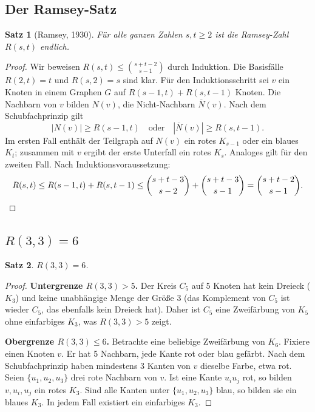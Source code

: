 \documentclass[12pt,a4paper]{amsart}
\newtheorem{theorem}{Satz}[section]
\theoremstyle{definition}
\theoremstyle{remark}
\begin{document}
\subsection{Der Ramsey-Satz}

\begin{theorem}[Ramsey, 1930]\label{satz:ramsey-endlich}
F\"ur alle ganzen Zahlen $s,t \ge 2$ ist die Ramsey-Zahl $R(s,t)$ endlich.
\end{theorem}

\begin{proof}
Wir beweisen $R(s,t) \le \binom{s+t-2}{s-1}$ durch Induktion.  Die Basisfälle
$R(2,t)=t$ und $R(s,2)=s$ sind klar.  F\"ur den Induktionsschritt sei $v$ ein
Knoten in einem Graphen $G$ auf $R(s-1,t)+R(s,t-1)$ Knoten.  Die Nachbarn von
$v$ bilden $N(v)$, die Nicht-Nachbarn $\overline{N}(v)$.  Nach dem Schubfachprinzip
gilt
\[
  |N(v)| \ge R(s-1,t) \quad \text{oder} \quad |\overline{N}(v)| \ge R(s,t-1).
\]
Im ersten Fall enth\"alt der Teilgraph auf $N(v)$ ein rotes $K_{s-1}$ oder ein
blaues $K_t$; zusammen mit $v$ ergibt der erste Unterfall ein rotes $K_s$.
Analoges gilt f\"ur den zweiten Fall.  Nach Induktionsvoraussetzung:
\[
  R(s,t) \le R(s-1,t) + R(s,t-1) \le \binom{s+t-3}{s-2} + \binom{s+t-3}{s-1}
  = \binom{s+t-2}{s-1}.\qedhere
\]
\end{proof}

\subsection{\texorpdfstring{$R(3,3) = 6$}{R(3,3) = 6}}

\begin{theorem}\label{satz:r33}
$R(3,3) = 6$.
\end{theorem}

\begin{proof}
\textbf{Untergrenze $R(3,3) > 5$.}
Der Kreis $C_5$ auf 5 Knoten hat kein Dreieck ($K_3$) und keine unabh\"angige
Menge der Gr\"o\ss{}e 3 (das Komplement von $C_5$ ist wieder $C_5$, das ebenfalls
kein Dreieck hat).  Daher ist $C_5$ eine Zweif\"arbung von $K_5$ ohne einfarbiges
$K_3$, was $R(3,3) > 5$ zeigt.

\textbf{Obergrenze $R(3,3) \le 6$.}
Betrachte eine beliebige Zweif\"arbung von $K_6$.  Fixiere einen Knoten $v$.
Er hat 5 Nachbarn, jede Kante rot oder blau gef\"arbt.  Nach dem Schubfachprinzip
haben mindestens 3 Kanten von $v$ dieselbe Farbe, etwa rot.  Seien
$\{u_1, u_2, u_3\}$ drei rote Nachbarn von $v$.  Ist eine Kante $u_i u_j$ rot,
so bilden $v, u_i, u_j$ ein rotes $K_3$.  Sind alle Kanten unter
$\{u_1, u_2, u_3\}$ blau, so bilden sie ein blaues $K_3$.  In jedem Fall
existiert ein einfarbiges $K_3$.
\end{proof}
\end{document}
